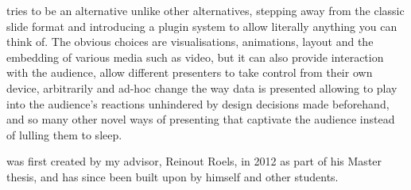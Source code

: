

    \mxp tries to be an alternative unlike other alternatives, stepping away
    from the classic slide format and introducing a plugin system to allow
    literally anything you can think of. The obvious choices are
    visualisations, animations, layout and the embedding of various media such
    as video, but it can also provide interaction with the audience, allow
    different presenters to take control from their own device, arbitrarily and
    ad-hoc change the way data is presented allowing to play into the
    audience's reactions unhindered by design decisions made beforehand, and so
    many other novel ways of presenting that captivate the audience instead of
    lulling them to sleep.

    \mxp was first created by my advisor, Reinout Roels, in 2012 as part of his
    Master thesis, and has since been built upon by himself and other students.


